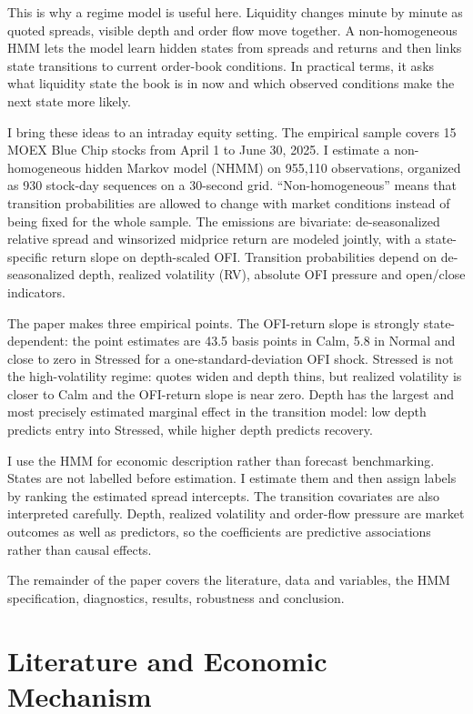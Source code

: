 \documentclass[12pt,a4paper]{article}
\begin{document}
This is why a regime model is useful here. Liquidity changes minute by minute as quoted spreads, visible depth  and order flow move together. A non-homogeneous HMM lets the model learn hidden states from spreads and returns and then links state transitions to current order-book conditions. In practical terms, it asks what liquidity state the book is in now and which observed conditions make the next state more likely.

I bring these ideas to an intraday equity setting. The empirical sample covers 15 MOEX Blue Chip stocks from April 1 to June 30, 2025. I estimate a non-homogeneous hidden Markov model (NHMM) on 955,110 observations, organized as 930 stock-day sequences on a 30-second grid. ``Non-homogeneous'' means that transition probabilities are allowed to change with market conditions instead of being fixed for the whole sample. The emissions are bivariate: de-seasonalized relative spread and winsorized midprice return are modeled jointly, with a state-specific return slope on depth-scaled OFI. Transition probabilities depend on de-seasonalized depth, realized volatility (RV), absolute OFI pressure  and open/close indicators.

The paper makes three empirical points. The OFI-return slope is strongly state-dependent: the point estimates are 43.5 basis points in Calm, 5.8 in Normal  and close to zero in Stressed for a one-standard-deviation OFI shock. Stressed is not the high-volatility regime: quotes widen and depth thins, but realized volatility is closer to Calm and the OFI-return slope is near zero. Depth has the largest and most precisely estimated marginal effect in the transition model: low depth predicts entry into Stressed, while higher depth predicts recovery.

I use the HMM for economic description rather than forecast benchmarking. States are not labelled before estimation. I estimate them and then assign labels by ranking the estimated spread intercepts. The transition covariates are also interpreted carefully. Depth, realized volatility  and order-flow pressure are market outcomes as well as predictors, so the coefficients are predictive associations rather than causal effects.

The remainder of the paper covers the literature, data and variables, the HMM specification, diagnostics, results, robustness  and conclusion.

\section{Literature and Economic Mechanism}\label{sec:literature}
\end{document}
